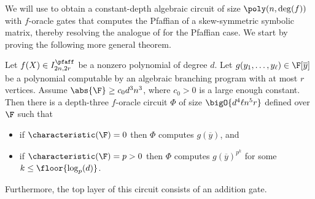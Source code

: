 \documentclass[letterpaper, 11pt]{amsart}
\begin{document}
We will use  to obtain a constant-depth algebraic circuit of size $\poly(n,\deg(f))$ with $f$-oracle gates that computes the Pfaffian of a skew-symmetric symbolic matrix, thereby resolving the analogue of  for the Pfaffian case. We start by proving the following more general theorem.
\begin{thrm}\label{thrm:ABP_pfaff_oracle}
    Let $f(X) \in I^{\pfaff}_{2n, 2r}$ be a nonzero polynomial of degree $d$.
    Let $g(y_1, \ldots, y_\ell) \in \F[\overline{y}]$ be a polynomial computable by an algebraic branching program with at most $r$ vertices.
    Assume $\abs{\F} \geq c_0 d^3 n^3$, where $c_0>0$ is a large enough constant.
    Then there is a depth-three $f$-oracle circuit $\Phi$ of size $\bigO{d^4 \ell n^5 r}$ defined over $\F$ such that 
    \begin{itemize}
        \item if $\characteristic(\F) = 0$ then $\Phi$ computes $g(\overline{y})$, and
        \item if $\characteristic(\F) = p > 0$ then $\Phi$ computes $g(\overline{y})^{p^k}$ for some $k \leq \floor{\log_p(d)}$.
    \end{itemize}
    Furthermore, the top layer of this circuit consists of an addition gate.
\end{thrm}
\end{document}
